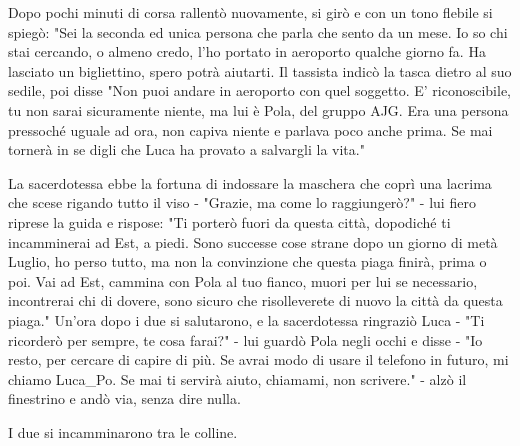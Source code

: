 Dopo pochi minuti di corsa rallentò nuovamente, si girò e con un tono flebile si spiegò: "Sei la seconda ed unica persona che parla che sento da un mese. Io so chi stai cercando, o almeno credo, l'ho portato in aeroporto qualche giorno fa. Ha lasciato un bigliettino, spero potrà aiutarti. Il tassista indicò la tasca dietro al suo sedile, poi disse "Non puoi andare in aeroporto con quel soggetto. E' riconoscibile, tu non sarai sicuramente niente, ma lui è Pola, del gruppo AJG. Era una persona pressoché uguale ad ora, non capiva niente e parlava poco anche prima. Se mai tornerà in se digli che Luca ha provato a salvargli la vita."

La sacerdotessa ebbe la fortuna di indossare la maschera che coprì una lacrima che scese rigando tutto il viso - "Grazie, ma come lo raggiungerò?" - lui fiero riprese la guida e rispose: "Ti porterò fuori da questa città, dopodiché ti incamminerai ad Est, a piedi. Sono successe cose strane dopo un giorno di metà Luglio, ho perso tutto, ma non la convinzione che questa piaga finirà, prima o poi. Vai ad Est, cammina con Pola al tuo fianco, muori per lui se necessario, incontrerai chi di dovere, sono sicuro che risolleverete di nuovo la città da questa piaga."
Un'ora dopo i due si salutarono, e la sacerdotessa ringraziò Luca - "Ti ricorderò per sempre, te cosa farai?" - lui guardò Pola negli occhi e disse - "Io resto, per cercare di capire di più. Se avrai modo di usare il telefono in futuro, mi chiamo Luca\_Po. Se mai ti servirà aiuto, chiamami, non scrivere." - alzò il finestrino e andò via, senza dire nulla.

I due si incamminarono tra le colline.
